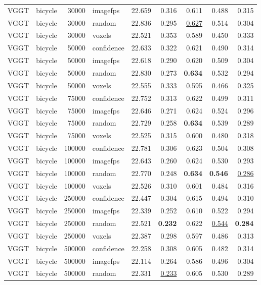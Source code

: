 \begin{table}[H]
\begin{tabular}{llrlrrrrr}
VGGT & bicycle & 30000 & imagefps & 22.659 & 0.316 & 0.611 & 0.488 & 0.315 \\
VGGT & bicycle & 30000 & random & 22.836 & 0.295 & \underline{0.627} & 0.514 & 0.304 \\
VGGT & bicycle & 30000 & voxels & 22.521 & 0.353 & 0.589 & 0.450 & 0.333 \\
VGGT & bicycle & 50000 & confidence & 22.633 & 0.322 & 0.621 & 0.490 & 0.314 \\
VGGT & bicycle & 50000 & imagefps & 22.618 & 0.290 & 0.620 & 0.509 & 0.304 \\
VGGT & bicycle & 50000 & random & 22.830 & 0.273 & \textbf{0.634} & 0.532 & 0.294 \\
VGGT & bicycle & 50000 & voxels & 22.555 & 0.333 & 0.595 & 0.466 & 0.325 \\
VGGT & bicycle & 75000 & confidence & 22.752 & 0.313 & 0.622 & 0.499 & 0.311 \\
VGGT & bicycle & 75000 & imagefps & 22.646 & 0.271 & 0.624 & 0.524 & 0.296 \\
VGGT & bicycle & 75000 & random & 22.729 & 0.258 & \textbf{0.634} & 0.539 & 0.289 \\
VGGT & bicycle & 75000 & voxels & 22.525 & 0.315 & 0.600 & 0.480 & 0.318 \\
VGGT & bicycle & 100000 & confidence & 22.781 & 0.306 & 0.623 & 0.504 & 0.308 \\
VGGT & bicycle & 100000 & imagefps & 22.643 & 0.260 & 0.624 & 0.530 & 0.293 \\
VGGT & bicycle & 100000 & random & 22.770 & 0.248 & \textbf{0.634} & \textbf{0.546} & \underline{0.286} \\
VGGT & bicycle & 100000 & voxels & 22.526 & 0.310 & 0.601 & 0.484 & 0.316 \\
VGGT & bicycle & 250000 & confidence & 22.447 & 0.304 & 0.615 & 0.494 & 0.310 \\
VGGT & bicycle & 250000 & imagefps & 22.339 & 0.252 & 0.610 & 0.522 & 0.294 \\
VGGT & bicycle & 250000 & random & 22.521 & \textbf{0.232} & 0.622 & \underline{0.544} & \textbf{0.284} \\
VGGT & bicycle & 250000 & voxels & 22.387 & 0.298 & 0.597 & 0.486 & 0.313 \\
VGGT & bicycle & 500000 & confidence & 22.258 & 0.308 & 0.605 & 0.482 & 0.314 \\
VGGT & bicycle & 500000 & imagefps & 22.114 & 0.264 & 0.586 & 0.496 & 0.304 \\
VGGT & bicycle & 500000 & random & 22.331 & \underline{0.233} & 0.605 & 0.530 & 0.289 \\

\end{tabular}
\end{table}
